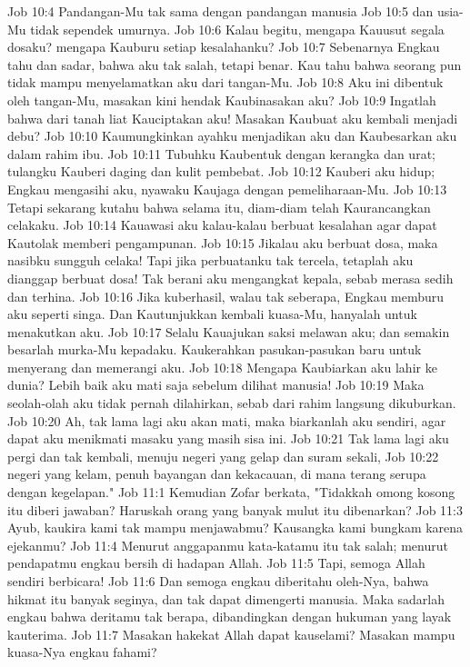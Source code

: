 Job 10:4  Pandangan-Mu tak sama dengan pandangan manusia
Job 10:5  dan usia-Mu tidak sependek umurnya.
Job 10:6  Kalau begitu, mengapa Kauusut segala dosaku? mengapa Kauburu setiap kesalahanku?
Job 10:7  Sebenarnya Engkau tahu dan sadar, bahwa aku tak salah, tetapi benar. Kau tahu bahwa seorang pun tidak mampu menyelamatkan aku dari tangan-Mu.
Job 10:8  Aku ini dibentuk oleh tangan-Mu, masakan kini hendak Kaubinasakan aku?
Job 10:9  Ingatlah bahwa dari tanah liat Kauciptakan aku! Masakan Kaubuat aku kembali menjadi debu?
Job 10:10  Kaumungkinkan ayahku menjadikan aku dan Kaubesarkan aku dalam rahim ibu.
Job 10:11  Tubuhku Kaubentuk dengan kerangka dan urat; tulangku Kauberi daging dan kulit pembebat.
Job 10:12  Kauberi aku hidup; Engkau mengasihi aku, nyawaku Kaujaga dengan pemeliharaan-Mu.
Job 10:13  Tetapi sekarang kutahu bahwa selama itu, diam-diam telah Kaurancangkan celakaku.
Job 10:14  Kauawasi aku kalau-kalau berbuat kesalahan agar dapat Kautolak memberi pengampunan.
Job 10:15  Jikalau aku berbuat dosa, maka nasibku sungguh celaka! Tapi jika perbuatanku tak tercela, tetaplah aku dianggap berbuat dosa! Tak berani aku mengangkat kepala, sebab merasa sedih dan terhina.
Job 10:16  Jika kuberhasil, walau tak seberapa, Engkau memburu aku seperti singa. Dan Kautunjukkan kembali kuasa-Mu, hanyalah untuk menakutkan aku.
Job 10:17  Selalu Kauajukan saksi melawan aku; dan semakin besarlah murka-Mu kepadaku. Kaukerahkan pasukan-pasukan baru untuk menyerang dan memerangi aku.
Job 10:18  Mengapa Kaubiarkan aku lahir ke dunia? Lebih baik aku mati saja sebelum dilihat manusia!
Job 10:19  Maka seolah-olah aku tidak pernah dilahirkan, sebab dari rahim langsung dikuburkan.
Job 10:20  Ah, tak lama lagi aku akan mati, maka biarkanlah aku sendiri, agar dapat aku menikmati masaku yang masih sisa ini.
Job 10:21  Tak lama lagi aku pergi dan tak kembali, menuju negeri yang gelap dan suram sekali,
Job 10:22  negeri yang kelam, penuh bayangan dan kekacauan, di mana terang serupa dengan kegelapan."
Job 11:1  Kemudian Zofar berkata, "Tidakkah omong kosong itu diberi jawaban? Haruskah orang yang banyak mulut itu dibenarkan?
Job 11:3  Ayub, kaukira kami tak mampu menjawabmu? Kausangka kami bungkam karena ejekanmu?
Job 11:4  Menurut anggapanmu kata-katamu itu tak salah; menurut pendapatmu engkau bersih di hadapan Allah.
Job 11:5  Tapi, semoga Allah sendiri berbicara!
Job 11:6  Dan semoga engkau diberitahu oleh-Nya, bahwa hikmat itu banyak seginya, dan tak dapat dimengerti manusia. Maka sadarlah engkau bahwa deritamu tak berapa, dibandingkan dengan hukuman yang layak kauterima.
Job 11:7  Masakan hakekat Allah dapat kauselami? Masakan mampu kuasa-Nya engkau fahami?
